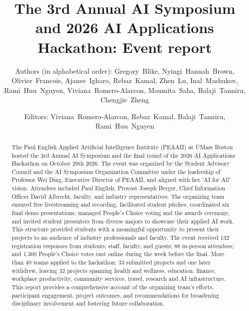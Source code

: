 \documentclass[sigconf,nonacm]{acmart}
\begin{document}
\title{The 3rd Annual AI Symposium and 2026 AI Applications Hackathon: Event report}

\author{\textmd{Authors (in alphabetical order):} \mbox{Gregory Blike}, \mbox{Nyingi Hannah Brown}, \mbox{Olivier Francois}, \mbox{Ajanee Igharo}, \mbox{Rebaz Kamal}, \mbox{Zhen Lu}, \mbox{Inal Mashukov}, \mbox{Rami Huu Nguyen}, \mbox{Viviana Romero-Alarcon}, \mbox{Moumita Saha}, \mbox{Balaji Tanniru}, \mbox{Chengjie Zheng}}
\author{\textmd{Editors:} \mbox{Viviana Romero-Alarcon}, \mbox{Rebaz Kamal}, \mbox{Balaji Tanniru}, \mbox{Rami Huu Nguyen}}

\renewcommand{\shortauthors}{PEAAII Student Advisory Council}

\begin{abstract}
The Paul English Applied Artificial Intelligence Institute (PEAAII) at UMass Boston hosted the 3rd Annual AI Symposium and the final round of the 2026 AI Applications Hackathon on October 29th 2026. The event was organized by the Student Advisory Council and the AI Symposium Organization Committee under the leadership of Professor Wei Ding, Executive Director of PEAAII, and aligned with her 'AI for All' vision. Attendees included Paul English, Provost Joseph Berger, Chief Information Officer David Albrecht, faculty, and industry representatives. The organizing team ensured free livestreaming and recording, facilitated student pitches, coordinated six final demo presentations, managed People's Choice voting and the awards ceremony, and invited student presenters from diverse majors to showcase their applied AI work. This structure provided students with a meaningful opportunity to present their projects to an audience of industry professionals and faculty. The event received 132 registration responses from students, staff, faculty, and guests; 88 in-person attendees; and 1,300 People's Choice votes cast online during the week before the final. More than 40 teams applied to the hackathon; 33 submitted projects and one later withdrew, leaving 32 projects spanning health and wellness, education, finance, workplace productivity, community services, travel, research and AI infrastructure. This report provides a comprehensive account of the organizing team's efforts, participant engagement, project outcomes, and recommendations for broadening disciplinary involvement and fostering future collaboration.

\end{abstract}
\end{document}
